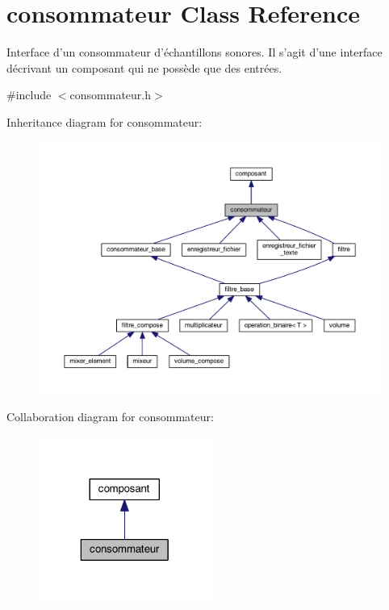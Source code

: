 \hypertarget{classconsommateur}{\section{consommateur Class Reference}
\label{classconsommateur}
}


Interface d'un consommateur d'échantillons sonores. Il s'agit d'une interface décrivant un composant qui ne possède que des entrées.  




{\ttfamily \#include $<$consommateur.\-h$>$}



Inheritance diagram for consommateur\-:
\nopagebreak
\begin{figure}[H]
\begin{center}
\leavevmode
\includegraphics[width=350pt]{classconsommateur__inherit__graph}
\end{center}
\end{figure}


Collaboration diagram for consommateur\-:
\nopagebreak
\begin{figure}[H]
\begin{center}
\leavevmode
\includegraphics[width=160pt]{classconsommateur__coll__graph}
\end{center}
\end{figure}
